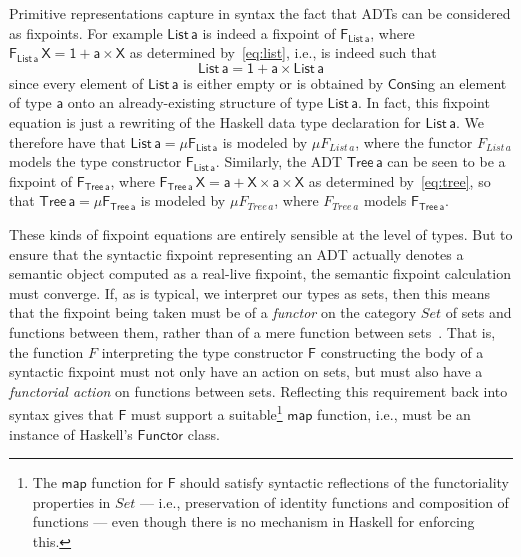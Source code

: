 \documentclass[acmsmall,screen,review,anonymous]{acmart}
\theoremstyle{definition}
\begin{document}
Primitive representations capture in syntax the fact that ADTs can be
considered as fixpoints. For example $\mathsf{List\,a}$ is indeed a
fixpoint of $\mathsf{F_{List\,a}}$, where $\mathsf{F_{List\,a}\,X} =
\mathsf{1 + a \times X}$ as determined by~\eqref{eq:list}, i.e., is
indeed such that
\[\mathsf{List\,a} = \mathsf{1 + a \times List\,a}\] 
since every element of $\mathsf{List\,a}$ is either empty or is
obtained by $\mathsf{Cons}$ing an element of type $\mathsf{a}$ onto an
already-existing structure of type $\mathsf{List\,a}$. In fact, this
fixpoint equation is just a rewriting of the Haskell data type
declaration for $\mathsf{List\,a}$. We therefore have that
$\mathsf{List\, a} = \mathsf{\mu F_{List\,a}}$ is modeled by $\mu
F_{\mathit{List}\,a}$, where the functor $F_{\mathit{List}\,a}$ models
the type constructor $\mathsf{F_{List\,a}}$. Similarly, the ADT
$\mathsf{Tree\,a}$ can be seen to be a fixpoint of
$\mathsf{F_{Tree\,a}}$, where $\mathsf{F_{Tree\,a}\,X} = \mathsf{a + X
  \times a \times X}$ as determined by~\eqref{eq:tree}, so that
$\mathsf{Tree\, a} = \mathsf{ \mu F_{Tree\,a}}$ is modeled by $\mu
F_{\mathit{Tree}\,a}$, where $F_{\mathit{Tree}\,a} $ models
$\mathsf{F_{Tree\,a}}$.
 
These kinds of fixpoint equations are entirely sensible at the level
of types. But to ensure that the syntactic fixpoint representing an
ADT actually denotes a semantic object computed as a real-live
fixpoint, the semantic fixpoint calculation must converge.  If, as is
typical, we interpret our types as sets, then this means that the
fixpoint being taken must be of a {\em functor} on the category
$\mathit{Set}$ of sets and functions between them, rather than of a
mere function between sets~\cite{tfca}.  That is, the function $F$
interpreting the type constructor $\mathsf{F}$ constructing the body
of a syntactic fixpoint must not only have an action on sets, but must
also have a {\em functorial action} on functions between
sets. Reflecting this requirement back into syntax gives that
$\mathsf{F}$ must support a suitable\footnote{The $\mathsf{map}$
  function for $\mathsf{F}$ should satisfy syntactic reflections of
  the functoriality properties in $\mathit{Set}$ --- i.e.,
  preservation of identity functions and composition of functions ---
  even though there is no mechanism in Haskell for enforcing this.}
$\mathsf{map}$ function, i.e., must be an instance of Haskell's
$\mathsf{Functor}$ class.
\end{document}
